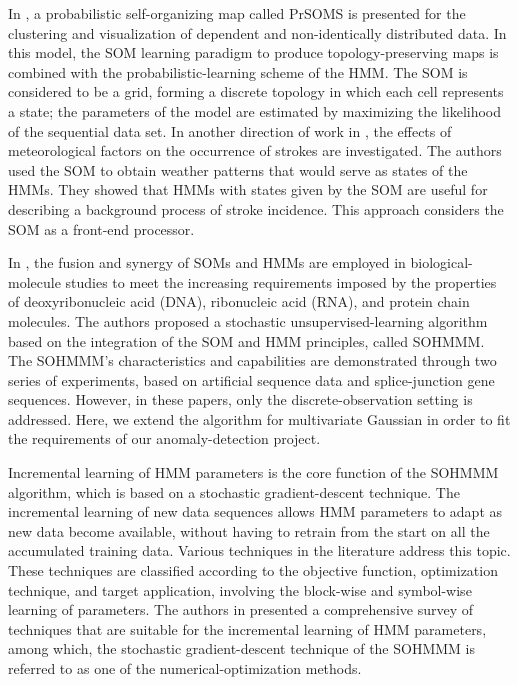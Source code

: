 In \citet{Ref39}, a probabilistic self-organizing map called PrSOMS is presented for the clustering and visualization of dependent and non-identically distributed data. In this model, the SOM learning paradigm to produce topology-preserving maps is combined with the probabilistic-learning scheme of the HMM. The SOM is considered to be a grid, forming a discrete topology in which each cell represents a state; the parameters of the model are estimated by maximizing the likelihood of the sequential data set. In another direction of work in \citet{Ref41}, the effects of meteorological factors on the occurrence of strokes are investigated. The authors used the SOM to obtain weather patterns that would serve as states of the HMMs. They showed that HMMs with states given by the SOM are useful for describing a background process of stroke incidence. This approach considers the SOM as a front-end processor.

In \citet{Ref1,Ref37,Ref38}, the fusion and synergy of SOMs and HMMs are employed in biological-molecule studies to meet the increasing requirements imposed by the properties of deoxyribonucleic acid (DNA), ribonucleic acid (RNA), and protein chain molecules. The authors proposed a stochastic unsupervised-learning algorithm based on the integration of the SOM and HMM principles, called SOHMMM. The SOHMMM's characteristics and capabilities are demonstrated through two series of experiments, based on artificial sequence data and splice-junction gene sequences. However, in these papers, only the discrete-observation setting is addressed. Here, we extend the algorithm for multivariate Gaussian in order to fit the requirements of our anomaly-detection project.

Incremental learning of HMM parameters is the core function of the SOHMMM algorithm, which is based on a stochastic gradient-descent technique. The incremental learning of new data sequences allows HMM parameters to adapt as new data become available, without having to retrain from the start on all the accumulated training data. Various techniques in the literature address this topic. These techniques are classified according to the objective function, optimization technique, and target application, involving the block-wise and symbol-wise learning of parameters. The authors in \citet{Ref25} presented a comprehensive survey of techniques that are suitable for the incremental learning of HMM parameters, among which, the stochastic gradient-descent technique of the SOHMMM is referred to as one of the numerical-optimization methods.

